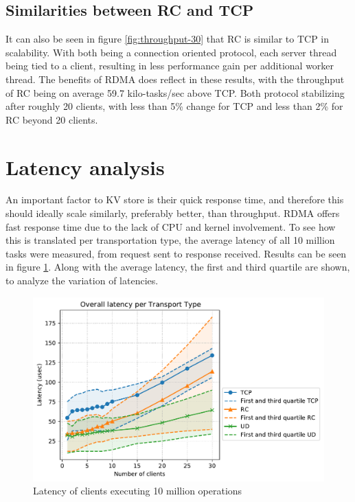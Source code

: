 \subsection{Similarities between RC and TCP}
It can also be seen in figure \ref{fig:throughput-30} that RC is similar to TCP in scalability.
With both being a connection oriented protocol, each server thread being tied to a client, resulting in less performance gain per additional worker thread.
The benefits of RDMA does reflect in these results, with the throughput of RC being on average 59.7 kilo-tasks/sec above TCP.
Both protocol stabilizing after roughly 20 clients, with less than 5\% change for TCP and less than 2\% for RC beyond 20 clients.


\section{Latency analysis}\label{sec:latency:analysis}
An important factor to KV store is their quick response time, and therefore this should ideally scale similarly, preferably better, than throughput.
RDMA offers fast response time due to the lack of CPU and kernel involvement.
To see how this is translated per transportation type, the average latency of all 10 million tasks were measured, from request sent to response received.
Results can be seen in figure \ref{fig:latency-30}.
Along with the average latency, the first and third quartile are shown, to analyze the variation of latencies.

\begin{figure}
    \centering
    \includegraphics[width=\columnwidth]{figures/PDF/Latency_avg_30}
    \caption{Latency of clients executing 10 million operations}
    \label{fig:latency-30}
\end{figure}

